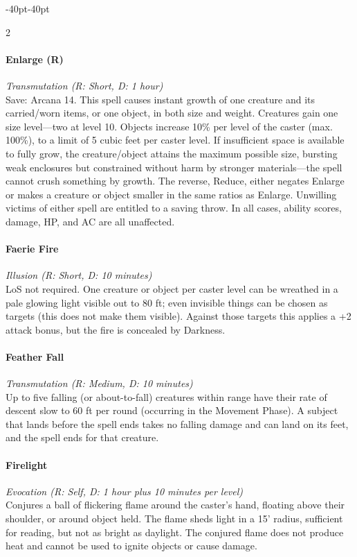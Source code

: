 \documentclass{book}
\begin{document}
\begin{adjustwidth}{-40pt}{-40pt}
\begin{multicols}{2}
\paragraph{Enlarge (R)}\label{enlarge-r}
\emph{Transmutation (R: Short, D: 1 hour)}\\
Save: Arcana 14. This spell causes instant growth of one creature and
its carried/worn items, or one object, in both size and weight.
Creatures gain one size level---two at level 10. Objects increase 10\%
per level of the caster (max. 100\%), to a limit of 5 cubic feet per
caster level. If insufficient space is available to fully grow, the
creature/object attains the maximum possible size, bursting weak
enclosures but constrained without harm by stronger materials---the
spell cannot crush something by growth. The reverse, Reduce, either
negates Enlarge or makes a creature or object smaller in the same ratios
as Enlarge. Unwilling victims of either spell are entitled to a saving
throw. In all cases, ability scores, damage, HP, and AC are all
unaffected.

\paragraph{Faerie Fire}\label{faerie-fire}
\emph{Illusion (R: Short, D: 10 minutes)}\\
LoS not required. One creature or object per caster level can be
wreathed in a pale glowing light visible out to 80 ft; even invisible
things can be chosen as targets (this does not make them visible).
Against those targets this applies a +2 attack bonus, but the fire is
concealed by Darkness.

\paragraph{Feather Fall}\label{feather-fall}
\emph{Transmutation (R: Medium, D: 10 minutes)}\\
Up to five falling (or about-to-fall) creatures within range have their
rate of descent slow to 60 ft per round (occurring in the Movement
Phase). A subject that lands before the spell ends takes no falling
damage and can land on its feet, and the spell ends for that creature.

\paragraph{Firelight}\label{firelight}
\emph{Evocation (R: Self, D: 1 hour plus 10 minutes per level)}\\
Conjures a ball of flickering flame around the caster's hand, floating
above their shoulder, or around object held. The flame sheds light in a
15' radius, sufficient for reading, but not as bright as daylight. The
conjured flame does not produce heat and cannot be used to ignite
objects or cause damage.


\end{multicols}
\end{adjustwidth}
\end{document}
